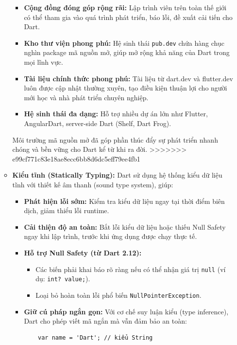 \documentclass[../DoAn.tex]{subfiles}
\numberwithin{figure}{chapter}
\begin{document}
\begin{itemize}
\begin{itemize}
\begin{itemize}
    \item \textbf{Cộng đồng đóng góp rộng rãi:} Lập trình viên trên toàn thế giới có thể tham gia vào quá trình phát triển, báo lỗi, đề xuất cải tiến cho Dart.
    \item \textbf{Kho thư viện phong phú:} Hệ sinh thái \texttt{pub.dev} chứa hàng chục nghìn package mã nguồn mở, giúp mở rộng khả năng của Dart trong mọi lĩnh vực.
    \item \textbf{Tài liệu chính thức phong phú:} Tài liệu từ dart.dev và flutter.dev luôn được cập nhật thường xuyên, tạo điều kiện thuận lợi cho người mới học và nhà phát triển chuyên nghiệp.
    \item \textbf{Hệ sinh thái đa dạng:} Hỗ trợ nhiều dự án lớn như Flutter, AngularDart, server-side Dart (Shelf, Dart Frog).
\end{itemize}

Môi trường mã nguồn mở đã góp phần thúc đẩy sự phát triển nhanh chóng và bền vững cho Dart kể từ khi ra đời.
>>>>>>> e99cf771c83e18ae8ecc6bb8d6dc5eff79ee4fb1

\vspace{0.5cm}

\item \textbf{Kiểu tĩnh (Statically Typing):} 
Dart sử dụng hệ thống kiểu dữ liệu tĩnh với thiết kế âm thanh (sound type system), giúp:

\begin{itemize}
    \item \textbf{Phát hiện lỗi sớm:} Kiểm tra kiểu dữ liệu ngay tại thời điểm biên dịch, giảm thiểu lỗi runtime.
    \item \textbf{Cải thiện độ an toàn:} Bắt lỗi kiểu dữ liệu hoặc thiếu Null Safety ngay khi lập trình, trước khi ứng dụng được chạy thực tế.
    \item \textbf{Hỗ trợ Null Safety (từ Dart 2.12):}
    \begin{itemize}
        \item Các biến phải khai báo rõ ràng nếu có thể nhận giá trị \texttt{null} (ví dụ: \texttt{int? value;}).
        \item Loại bỏ hoàn toàn lỗi phổ biến \texttt{NullPointerException}.
    \end{itemize}
    \item \textbf{Giữ cú pháp ngắn gọn:} Với cơ chế suy luận kiểu (type inference), Dart cho phép viết mã ngắn mà vẫn đảm bảo an toàn:
    \begin{verbatim}
    var name = 'Dart'; // kiểu String
    \end{verbatim}
\end{itemize}


\end{itemize}
\end{itemize}
\end{document}

